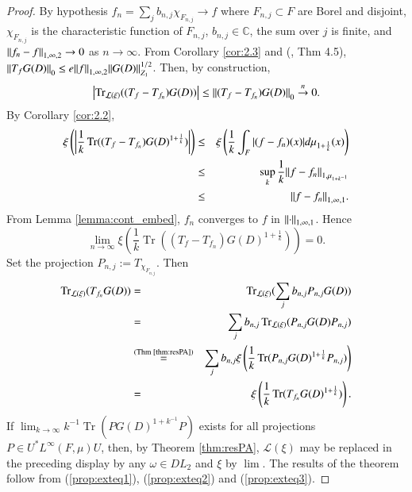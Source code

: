 \documentclass[final,1p]{elsarticle}
\numberwithin{equation}{section}
\theoremstyle{plain}
\theoremstyle{definition}
\newcounter{prop2count}
\begin{document}
\begin{proof}
By hypothesis $f_n = \sum_j b_{n,j} \chi_{F_{n,j}} \to f$ where $F_{n,j} \subset F$ are Borel and disjoint, $\chi_{F_{n,j}}$ is the characteristic function of $F_{n,j}$, $b_{n,j} \in {\ensuremath{\mathbb{C}}}$, the sum over $j$ is finite, and ${\mbox{\ensuremath{\| {f_n-f} \|}}}_{1,\infty,2} \to 0$ as $n \to \infty$.  From Corollary \ref{cor:2.3} and (\cite{CRSS}, Thm 4.5),
${\mbox{\ensuremath{\| {T_f G(D)} \|}}}_0 \leq e {\mbox{\ensuremath{\| {f} \|}}}_{1,\infty,2} {\mbox{\ensuremath{\| {G(D)} \|}}}_{Z_1}^{1/2}$.  
Then, by construction,
\begin{equation} \label{prop:exteq1}
\left| \operatorname{Tr}_{\mathcal{L}({\ensuremath{\xi}})}((T_f-T_{f_n})G(D)) \right| \leq {\mbox{\ensuremath{\| {(T_f-T_{f_n})G(D)} \|}}}_0
\stackrel{n}{\to} 0 . 
\end{equation}
By Corollary \ref{cor:2.2},
\begin{eqnarray*}
{\ensuremath{\xi}} \left( \left| \frac 1k \operatorname{Tr}((T_{f}-T_{f_n})G(D)^{1 +\frac 1k}) \right| \right)
& \leq & {\ensuremath{\xi}} \left( \frac 1k \int_F |(f-f_n)(x)| d\mu_{1 + \frac 1k}(x) \right) \\
& \leq & \sup_k  \frac 1k {\mbox{\ensuremath{\| {f-f_n} \|}}}_{1,\mu_{1+k^{-1}}}  \\
& \leq & {\mbox{\ensuremath{\| {f-f_n} \|}}}_{1,\infty,1}.
\end{eqnarray*}
From Lemma \ref{lemma:cont_embed}, $f_n$ converges to $f$ in ${\mbox{\ensuremath{\| {\cdot} \|}}}_{1,\infty,1}$.  Hence
\begin{equation} \label{prop:exteq2}
\lim_{n \to \infty} {\ensuremath{\xi}} \left( \frac 1k \operatorname{Tr}((T_f-T_{f_n})G(D)^{1 +\frac 1k}) \right)
= 0 .
\end{equation}
Set the projection $P_{n,j} := T_{\chi_{F_{n,j}}}$.  Then
\begin{eqnarray}
\operatorname{Tr}_{\mathcal{L}({\ensuremath{\xi}})}(T_{f_n}G(D)) & = &
\operatorname{Tr}_{\mathcal{L}({\ensuremath{\xi}})}(\sum_j b_{n,j} P_{n,j}G(D)) \nonumber \\
& = & \sum_j b_{n,j} \operatorname{Tr}_{\mathcal{L}({\ensuremath{\xi}})}(P_{n,j}G(D)P_{n,j}) \nonumber \\
& \stackrel{\text{(Thm \ref{thm:resPA})}}{=} & \sum_j b_{n,j} {\ensuremath{\xi}} \left( \frac 1k \operatorname{Tr}(P_{n,j}G(D)^{1 +\frac 1k}P_{n,j}) \right) \nonumber \\
& = & {\ensuremath{\xi}} \left( \frac 1k \operatorname{Tr}(T_{f_n}G(D)^{1 +\frac 1k}) \right) .  \label{prop:exteq3}
\end{eqnarray}
If $\lim_{k \to \infty} k^{-1} \operatorname{Tr}(PG(D)^{1 + k^{-1}}P)$ exists
for all projections $P \in U^*L^\infty(F,\mu)U$,
then, by Theorem \ref{thm:resPA}, $\mathcal{L}({\ensuremath{\xi}})$ may be replaced in the preceding display by any $\omega \in DL_2$ and ${\ensuremath{\xi}}$ by $\lim$.
The results of the theorem follow from (\ref{prop:exteq1}), (\ref{prop:exteq2}) and (\ref{prop:exteq3}).
\end{proof}
\end{document}

